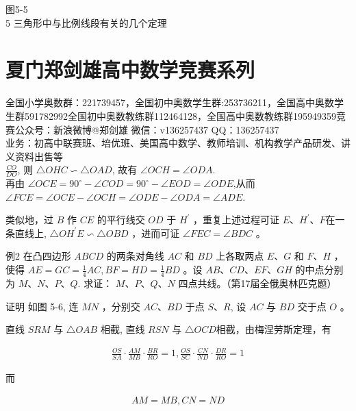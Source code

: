 \documentclass[10pt]{article}
\begin{document}
图5-5\\
5 三角形中与比例线段有关的几个定理

\section*{夏门郑剑雄高中数学竞赛系列}
全国小学奥数群：221739457，全国初中奥数学生群:253736211，全国高中奥数学生群591782992全国初中奥数教练群112464128，全国高中奥数教练群195949359竞赛公众号：新浪微博@郑剑雄 微信：v136257437 QQ：136257437\\
业务：初高中联赛班、培优班、美国高中数学、教师培训、机构教学产品研发、讲义资料出售等\\
$\frac{C O}{D O}$, 则 $\triangle O H C \backsim \triangle O A D$, 故有 $\angle O C H=\angle O D A$.\\
再由 $\angle O C E=90^{\circ}-\angle C O D=90^{\circ}-\angle E O D=\angle O D E$,从而 $\angle F C E=\angle O C E-\angle O C H=\angle O D E-\angle O D A=\angle A D E$.

类似地，过 $B$ 作 $C E$ 的平行线交 $O D$ 于 $H^{\prime}$ ，重复上述过程可证 $E 、 H^{\prime} 、 F$在一条直线上, $\triangle O H^{\prime} E \backsim \triangle O B D$ ，进而可证 $\angle F E C=\angle B D C$ 。

例2 在凸四边形 $A B C D$ 的两条对角线 $A C$ 和 $B D$ 上各取两点 $E 、 G$ 和 $F 、 H$ ，使得 $A E=G C=\frac{1}{4} A C, B F=H D=\frac{1}{4} B D$ 。设 $A B 、 C D 、 E F 、 G H$ 的中点分别为 $M 、 N 、 P 、 Q$. 求证： $M 、 P 、 Q 、 N$ 四点共线。（第17届全俄奥林匹克题）

证明 如图 5-6, 连 $M N$ ，分别交 $A C 、 B D$ 于点 $S 、 R$, 设 $A C$ 与 $B D$ 交于点 $O$ 。

直线 $S R M$ 与 $\triangle O A B$ 相截, 直线 $R S N$ 与 $\triangle O C D$相截，由梅涅劳斯定理，有

\begin{align*}
\frac{O S}{S A} \cdot \frac{A M}{M B} \cdot \frac{B R}{R O}=1, \frac{O S}{S C} \cdot \frac{C N}{N D} \cdot \frac{D R}{R O}=1
\end{align*}

而

\begin{align*}
A M=M B, C N=N D
\end{align*}
\end{document}
